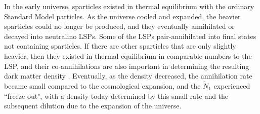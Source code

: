 \documentclass[11pt]{article}
\def\stilde{\widetilde}
\def\NI{\stilde N_1}
\begin{document}
In the early universe, sparticles existed in thermal equilibrium with the 
ordinary Standard Model particles. As the universe cooled and expanded, 
the heavier sparticles could no longer be produced, and they 
eventually annihilated or 
decayed into neutralino LSPs.  Some of the LSPs 
pair-annihilated into final states not containing sparticles. If there are 
other sparticles that are only slightly heavier, then they existed in 
thermal equilibrium in comparable numbers to the LSP, and their 
co-annihilations are also important in determining the resulting dark 
matter density \cite{GriestSeckel,Gondolo:1990dk}. Eventually, as the 
density decreased, the annihilation rate became small compared to the 
cosmological expansion, and the $\NI$ experienced ``freeze out", with a 
density today determined by this small rate and the subsequent dilution 
due to the expansion of the universe.
\end{document}
